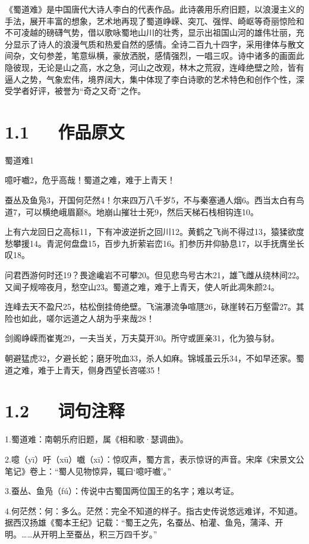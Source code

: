 \documentclass[letterpaper,12pt,english]{sphinxmanual}
\begin{document}
《蜀道难》是中国唐代大诗人李白的代表作品。此诗袭用乐府旧题，以浪漫主义的手法，展开丰富的想象，艺术地再现了蜀道峥嵘、突兀、强悍、崎岖等奇丽惊险和不可凌越的磅礴气势，借以歌咏蜀地山川的壮秀，显示出祖国山河的雄伟壮丽，充分显示了诗人的浪漫气质和热爱自然的感情。全诗二百九十四字，采用律体与散文间杂，文句参差，笔意纵横，豪放洒脱，感情强烈，一唱三叹。诗中诸多的画面此隐彼现，无论是山之高，水之急，河山之改观，林木之荒寂，连峰绝壁之险，皆有逼人之势，气象宏伟，境界阔大，集中体现了李白诗歌的艺术特色和创作个性，深受学者好评，被誉为“奇之又奇”之作。


\section{1.1   作品原文}
\label{\detokenize{p01_u6563_u6587/_u674e_u767d-_u8700_u9053_u96be:id3}}
蜀道难1

噫吁嚱2，危乎高哉！蜀道之难，难于上青天！

蚕丛及鱼凫3，开国何茫然4！尔来四万八千岁5，不与秦塞通人烟6。西当太白有鸟道7，可以横绝峨眉巅8。地崩山摧壮士死9，然后天梯石栈相钩连10。

上有六龙回日之高标11，下有冲波逆折之回川12。黄鹤之飞尚不得过13，猿猱欲度愁攀援14。青泥何盘盘15，百步九折萦岩峦16。扪参历井仰胁息17，以手抚膺坐长叹18。

问君西游何时还19？畏途巉岩不可攀20。但见悲鸟号古木21，雄飞雌从绕林间22。又闻子规啼夜月，愁空山23。蜀道之难，难于上青天，使人听此凋朱颜24。

连峰去天不盈尺25，枯松倒挂倚绝壁。飞湍瀑流争喧豗26，砯崖转石万壑雷27。其险也如此，嗟尔远道之人胡为乎来哉28！

剑阁峥嵘而崔嵬29，一夫当关，万夫莫开30。所守或匪亲31，化为狼与豺。

朝避猛虎32，夕避长蛇；磨牙吮血33，杀人如麻。锦城虽云乐34，不如早还家。蜀道之难，难于上青天，侧身西望长咨嗟35！


\section{1.2   词句注释}
\label{\detokenize{p01_u6563_u6587/_u674e_u767d-_u8700_u9053_u96be:id4}}
1.蜀道难：南朝乐府旧题，属《相和歌·瑟调曲》。

2.噫（yī）吁（xū）嚱（xī）：惊叹声，蜀方言，表示惊讶的声音。宋庠《宋景文公笔记》卷上：“蜀人见物惊异，辄曰‘噫吁嚱’。”

3.蚕丛、鱼凫（fú）：传说中古蜀国两位国王的名字；难以考证。

4.何茫然：何：多么。茫然：完全不知道的样子。指古史传说悠远难详，不知道。据西汉扬雄《蜀本王纪》记载：“蜀王之先，名蚕丛、柏灌、鱼凫，蒲泽、开明。……从开明上至蚕丛，积三万四千岁。”
\end{document}
